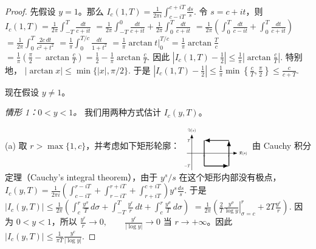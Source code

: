 \begin{proof}
	先假设 $y=1$。那么
	\(\textstyle I_c(1,\allowbreak{}T)=\allowbreak{}\frac1{2\pi i}\int_{c-iT}^{c+\allowbreak{}iT}\frac{ds}{s}.\)
	令 $s=c+it$，则
	\(\textstyle I_c(1,\allowbreak{}T) =\allowbreak{} \frac1{2\pi}\int_{-T}^T\frac{dt}{c+\allowbreak{}it}\) \(\textstyle =\allowbreak{} \frac1{2\pi}\int_{-T}^0\frac{dt}{c+\allowbreak{}it} +\allowbreak{} \frac1{2\pi}\int_0^T\frac{dt}{c+\allowbreak{}it}\) \(\textstyle =\allowbreak{} \frac1{2\pi}\left(\int_0^T\frac{dt}{c-it} +\allowbreak{} \int_0^T\frac{dt}{c+\allowbreak{}it}\right)\) \(\textstyle =\allowbreak{} \frac1{2\pi}\int_0^T\frac{2c\,dt}{c^2+\allowbreak{}t^2}\) \(\textstyle =\allowbreak{} \frac1\pi\int_0^{T/c}\frac{dt}{1+\allowbreak{}t^2}\) \(\textstyle =\allowbreak{} \frac1\pi\arctan t\bigg|_0^{T/c} =\allowbreak{} \frac1\pi\arctan\frac{T}{c}\) \(\textstyle =\allowbreak{} \frac1\pi\left(\frac\pi2-\arctan\frac{c}{T}\right) =\allowbreak{} \frac12-\frac1\pi\arctan\frac{c}{T}.\)
	因此
	\(\textstyle \left|I_c(1,\allowbreak{}T)-\frac12\right| \leq\allowbreak{} \frac1\pi\left|\arctan\frac{c}{T}\right|.\)
	特别地，
	\(\textstyle |\arctan x|\leq\allowbreak{} \min\{|x|,\allowbreak{}\pi/2\}.\)
	于是
	\(\textstyle \left|I_c(1,\allowbreak{}T)-\frac12\right| \leq\allowbreak{} \frac1\pi\min\left\{\frac{c}{T},\allowbreak{}\frac\pi2\right\} \leq\allowbreak{} \frac{c}{c+\allowbreak{}T}.\)

	现在假设 $y\neq 1$。

	\emph{情形 1：$0<y<1$。} 我们用两种方式估计 $I_c(y,T)$。

	(a) 取 $r>\max\{1,c\}$，并考虑如下矩形轮廓：
	\(\textstyle \begin{tikzpicture}[baseline={(current bounding box.center)}, scale=0.49, transform shape, >=Latex, x=1.05cm, y=0.9cm] \draw[->] (-0.4,0) -- (3.7,0) node[right] {$\Re(s)$}; \draw[->] (0,-1.6) -- (0,1.8) node[above] {$\Im(s)$}; \draw[thick, ->] (1,-1.2) -- (3,-1.2); \draw[thick, ->] (3,-1.2) -- (3,1.2); \draw[thick, ->] (3,1.2) -- (1,1.2); \draw[thick] (1,1.2) -- (1,-1.2); \node[below] at (1,0) {$c$}; \node[below] at (3,0) {$r$}; \node[left] at (0,1.2) {$T$}; \node[left] at (0,-1.2) {$-T$}; \end{tikzpicture}\)
	由 Cauchy 积分定理（Cauchy's integral theorem），由于 $y^s/s$ 在这个矩形内部没有极点，
	\(\textstyle I_c(y,\allowbreak{}T)=\allowbreak{} \frac1{2\pi i} \left( \int_{c-iT}^{r-iT} +\allowbreak{} \int_{r-iT}^{r+\allowbreak{}iT} +\allowbreak{} \int_{r+\allowbreak{}iT}^{c+\allowbreak{}iT} \right)y^s\frac{ds}{s}.\)
	于是
	\(\textstyle |I_c(y,\allowbreak{}T)| \leq\allowbreak{} \frac1{2\pi} \left( \int_c^r\frac{y^\sigma}{T}\,d\sigma +\allowbreak{} \int_{-T}^T\frac{y^r}{r}\,dt +\allowbreak{} \int_c^r\frac{y^\sigma}{T}\,d\sigma \right)\) \(\textstyle =\allowbreak{} \frac1{2\pi} \left( \frac2T\left.\frac{y^\sigma}{\log y}\right|_{\sigma=\allowbreak{}c}^r +\allowbreak{} 2T\frac{y^r}{r} \right).\)
	因为 $0<y<1$，所以
	\(\textstyle \frac{y^r}{r}\to\allowbreak{} 0,\allowbreak{} \qquad \frac{y^r}{|\log y|}\to\allowbreak{} 0\)
	当 $r\to+\infty$。因此
	\(\textstyle |I_c(y,\allowbreak{}T)| \leq\allowbreak{} \frac1{\pi T}\frac{y^c}{|\log y|}.\)


\end{proof}
